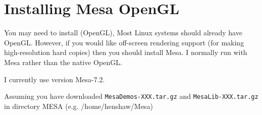 \documentclass{article}
\begin{document}
\clearpage
\section{Installing Mesa OpenGL}

You may need to install  (OpenGL),
Most Linux systems should already have OpenGL. However, if you would like off-screen rendering
support (for making high-resolution hard copies) then you should install Mesa. I normally run with
Mesa rather than the native OpenGL.

I currently use version Mesa-7.2.

Assuming you have downloaded {\tt MesaDemos-XXX.tar.gz} and {\tt  MesaLib-XXX.tar.gz}
in directory MESA (e.g. /home/henshaw/Mesa)
\end{document}
